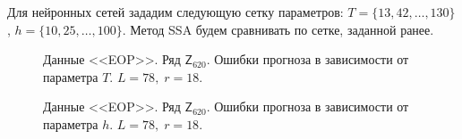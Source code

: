 \documentclass[specialist,
               substylefile = spbu.rtx,
               subf,href,colorlinks=true, 12p]{disser}
\begin{document}
Для нейронных сетей зададим следующую сетку параметров: $T = \{13, 42, \ldots, 130 \}$, $h = \{10, 25, \ldots, 100 \}$. Метод SSA будем сравнивать по сетке, заданной ранее.

\begin{figure}[H]
	\captionsetup{justification=centering}
	\caption{Данные <<EOP>>. Ряд $\mathsf{Z}_{620}$. Ошибки прогноза в зависимости от параметра $T$. $L = 78, \; r = 18$.}
	\label{x_pole_comp}
\end{figure}

\begin{figure}[H]
	\captionsetup{justification=centering}
	\caption{Данные <<EOP>>. Ряд $\mathsf{Z}_{620}$. Ошибки прогноза в зависимости от параметра $h$. $L = 78, \; r = 18$.}
	\label{x_pole_comp.h}
\end{figure}
\end{document}
